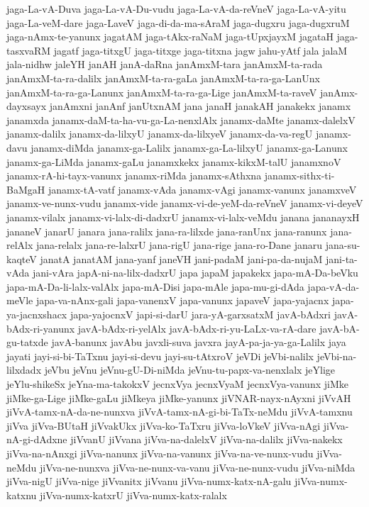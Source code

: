 {jaga-La-vA-Duva
jaga-La-vA-Du-vudu
jaga-La-vA-da-reVneV
jaga-La-vA-yitu
jaga-La-veM-dare
jaga-LaveV
jaga-di-da-ma-sAraM
jaga-dugxru
jaga-dugxruM
jaga-nAmx-te-yanunx
jagatAM
jaga-tAkx-raNaM
jaga-tUpxjayxM
jagataH
jaga-tasxvaRM
jagatf
jaga-titxgU
jaga-titxge
jaga-titxna
jagw
jahu-yAtf
jala
jalaM
jala-nidhw
jaleYH
janAH
janA-daRna
janAmxM-tara
janAmxM-ta-rada
janAmxM-ta-ra-dalilx
janAmxM-ta-ra-gaLa
janAmxM-ta-ra-ga-LanUnx
janAmxM-ta-ra-ga-Lanunx
janAmxM-ta-ra-ga-Lige
janAmxM-ta-raveV
janAmx-dayxsayx
janAmxni
janAnf
janUtxnAM
jana
janaH
janakAH
janakekx
janamx
janamxda
janamx-daM-ta-ha-vu-ga-La-nenxlAlx
janamx-daMte
janamx-dalelxV
janamx-dalilx
janamx-da-lilxyU
janamx-da-lilxyeV
janamx-da-va-regU
janamx-davu
janamx-diMda
janamx-ga-Lalilx
janamx-ga-La-lilxyU
janamx-ga-Lanunx
janamx-ga-LiMda
janamx-gaLu
janamxkekx
janamx-kikxM-talU
janamxnoV
janamx-rA-hi-tayx-vanunx
janamx-riMda
janamx-sAthxna
janamx-sithx-ti-BaMgaH
janamx-tA-vatf
janamx-vAda
janamx-vAgi
janamx-vanunx
janamxveV
janamx-ve-nunx-vudu
janamx-vide
janamx-vi-de-yeM-da-reVneV
janamx-vi-deyeV
janamx-vilalx
janamx-vi-lalx-di-dadxrU
janamx-vi-lalx-veMdu
janana
jananayxH
jananeV
janarU
janara
jana-ralilx
jana-ra-lilxde
jana-ranUnx
jana-ranunx
jana-relAlx
jana-relalx
jana-re-lalxrU
jana-rigU
jana-rige
jana-ro-Dane
janaru
jana-su-kaqteV
janatA
janatAM
jana-yanf
janeVH
jani-padaM
jani-pa-da-nujaM
jani-ta-vAda
jani-vAra
japA-ni-na-lilx-dadxrU
japa
japaM
japakekx
japa-mA-Da-beVku
japa-mA-Da-li-lalx-valAlx
japa-mA-Disi
japa-mAle
japa-mu-gi-dAda
japa-vA-da-meVle
japa-va-nAnx-gali
japa-vanenxV
japa-vanunx
japaveV
japa-yajacnx
japa-ya-jacnxshacx
japa-yajocnxV
japi-si-darU
jara-yA-garxsatxM
javA-bAdxri
javA-bAdx-ri-yanunx
javA-bAdx-ri-yelAlx
javA-bAdx-ri-yu-LaLx-va-rA-dare
javA-bA-gu-tatxde
javA-banunx
javAbu
javxli-suva
javxra
jayA-pa-ja-ya-ga-Lalilx
jaya
jayati
jayi-si-bi-TaTxnu
jayi-si-devu
jayi-su-tAtxroV
jeVDi
jeVbi-nalilx
jeVbi-na-lilxdadx
jeVbu
jeVnu
jeVnu-gU-Di-niMda
jeVnu-tu-papx-va-nenxlalx
jeYlige
jeYlu-shikeSx
jeYna-ma-takokxV
jecnxVya
jecnxVyaM
jecnxVya-vanunx
jiMke
jiMke-ga-Lige
jiMke-gaLu
jiMkeya
jiMke-yanunx
jiVNAR-nayx-nAyxni
jiVvAH
jiVvA-tamx-nA-da-ne-nunxva
jiVvA-tamx-nA-gi-bi-TaTx-neMdu
jiVvA-tamxnu
jiVva
jiVva-BUtaH
jiVvakUkx
jiVva-ko-TaTxru
jiVva-loVkeV
jiVva-nAgi
jiVva-nA-gi-dAdxne
jiVvanU
jiVvana
jiVva-na-dalelxV
jiVva-na-dalilx
jiVva-nakekx
jiVva-na-nAnxgi
jiVva-nanunx
jiVva-na-vanunx
jiVva-na-ve-nunx-vudu
jiVva-neMdu
jiVva-ne-nunxva
jiVva-ne-nunx-va-vanu
jiVva-ne-nunx-vudu
jiVva-niMda
jiVva-nigU
jiVva-nige
jiVvanitx
jiVvanu
jiVva-numx-katx-nA-galu
jiVva-numx-katxnu
jiVva-numx-katxrU
jiVva-numx-katx-ralalx
}
